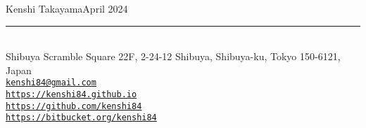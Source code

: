 {\Large\sc Kenshi Takayama}\hfill April 2024
\rule{\textwidth}{1pt}\\
{\small
Shibuya Scramble Square 22F, 2-24-12 Shibuya, Shibuya-ku, Tokyo 150-6121, Japan\\
\href{mailto:kenshi84@gmail.com}{{\tt kenshi84@gmail.com}}\\
\href{https://kenshi84.github.io}{{\tt https://kenshi84.github.io}}\\
\href{https://github.com/kenshi84}{{\tt https://github.com/kenshi84}}\\
\href{https://bitbucket.org/kenshi84}{{\tt https://bitbucket.org/kenshi84}}
}
\vspace{2mm}
